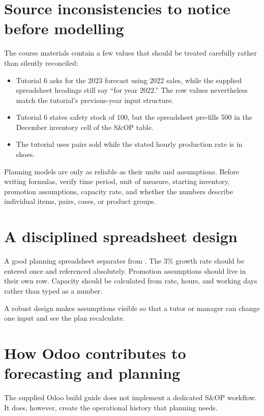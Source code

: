 \section{Source inconsistencies to notice before modelling}

The course materials contain a few values that should be treated carefully rather than silently reconciled:

\begin{itemize}
  \item Tutorial 6 asks for the 2023 forecast using 2022 sales, while the supplied spreadsheet headings still say ``for year 2022.'' The row values nevertheless match the tutorial's previous-year input structure.
  \item Tutorial 6 states safety stock of 100, but the spreadsheet pre-fills 500 in the December inventory cell of the S\&OP table.
  \item The tutorial uses pairs sold while the stated hourly production rate is in shoes.
\end{itemize}

\begin{keyidea}
Planning models are only as reliable as their units and assumptions. Before writing formulas, verify time period, unit of measure, starting inventory, promotion assumptions, capacity rate, and whether the numbers describe individual items, pairs, cases, or product groups.
\end{keyidea}

\section{A disciplined spreadsheet design}

A good planning spreadsheet separates  from . The 3\% growth rate should be entered once and referenced absolutely. Promotion assumptions should live in their own row. Capacity should be calculated from rate, hours, and working days rather than typed as a number.

A robust design makes assumptions visible so that a tutor or manager can change one input and see the plan recalculate.

\section{How Odoo contributes to forecasting and planning}

The supplied Odoo build guide does not implement a dedicated S\&OP workflow. It does, however, create the operational history that planning needs.

